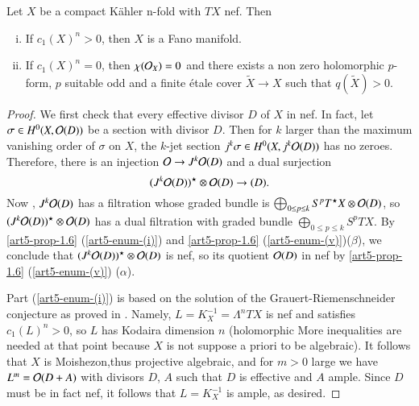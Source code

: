 \begin{prop}\label{art5-prop-3.9}
Let $X$ be a compact K\"ahler n-fold with $TX$ nef. Then
    \begin{enumerate}[(i)]
    \item If $c_{1}(X)^{n} > 0$, then $X$ is a Fano manifold.\label{art5-enum-[i]} 
    \item If $c_{1}(X)^{n} = 0$, then $^{}{\chi}(\mathcal{O}_{X}) = 0$ and there exists a non zero holomorphic $p$-form, $p$ suitable odd and a finite \'etale cover $\widetilde{X} \rightarrow X$ such that $q(\widetilde{X}) > 0$.\label{art5-enum-[ii]}
    \end{enumerate}
\end{prop}

\begin{proof}
We first check that every effective divisor $D$ of $X$ in nef. In fact, let $\sigma \in H^{0}(X, \mathcal{O}(D))$ be a section with divisor $D$. Then for $k$ larger than the maximum vanishing order of $\sigma$ on $X$, the $k$-jet section $j^{k}\sigma \in H^{0}(X, j^{k}\mathcal{O}(D))$ has no zeroes. Therefore, there is an injection $\mathcal{O} \rightarrow J^{k}\mathcal{O}(D)$ and a dual surjection
$$
(J^{k}\mathcal{O}(D))^{\star} \otimes \mathcal{O}(D)\rightarrow(D).
$$
Now , $J^{k}\mathcal{O}(D)$ has a filtration whose graded bundle is $\bigoplus_{0\leq p\leq k}S^{p}T^{\star}X\otimes \mathcal{O}(D)$,
so $(J^{k}\mathcal{O}(D))^{\star} \otimes \mathcal{O} (D)$ has a dual filtration with graded bundle $\bigoplus_{0\leq p\leq k}S^{p}TX$.
By \ref{art5-prop-1.6} (\ref{art5-enum-(i)}) and \ref{art5-prop-1.6} (\ref{art5-enum-(v)})($\beta$), we conclude that $(J^{k}\mathcal{O}(D))^{\star}\otimes \mathcal{O} (D)$ is nef, so its quotient $\mathcal{O} (D)$ in nef by \ref{art5-prop-1.6}
(\ref{art5-enum-(v)}) ($\alpha$). 

Part (\ref{art5-enum-(i)}) is based on the solution of the Grauert-Riemenschneider conjecture as proved in \cite{art5-keyDe85}. Namely, $L=K_{X}^{-1} = \Lambda^{n}TX$ is nef and satisfies $c_{1}(L)^{n} > 0$, so $L$ has Kodaira dimension $n$ (holomorphic More inequalities are needed at that point because $X$ is not suppose a priori to be algebraic).
It follows that $X$ is Moishezon,thus projective algebraic, and for $m > 0$ large we have $L^{m} = \mathcal{O}(D+A)$ with divisors $D$, $A$ such that $D$ is effective and $A$ ample. Since $D$ must be in fact nef, it follows that $L=K_{X}^{-1}$ is ample, as desired.


\end{proof}
